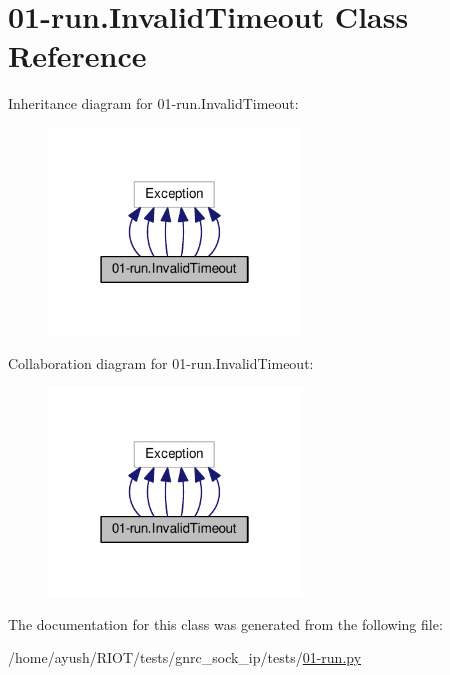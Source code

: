 \hypertarget{class01-run_1_1InvalidTimeout}{}\section{01-\/run.Invalid\+Timeout Class Reference}
\label{class01-run_1_1InvalidTimeout}


Inheritance diagram for 01-\/run.Invalid\+Timeout\+:
\nopagebreak
\begin{figure}[H]
\begin{center}
\leavevmode
\includegraphics[width=190pt]{class01-run_1_1InvalidTimeout__inherit__graph}
\end{center}
\end{figure}


Collaboration diagram for 01-\/run.Invalid\+Timeout\+:
\nopagebreak
\begin{figure}[H]
\begin{center}
\leavevmode
\includegraphics[width=190pt]{class01-run_1_1InvalidTimeout__coll__graph}
\end{center}
\end{figure}


The documentation for this class was generated from the following file\+:\begin{DoxyCompactItemize}
\item 
/home/ayush/\+R\+I\+O\+T/tests/gnrc\+\_\+sock\+\_\+ip/tests/\hyperlink{gnrc__sock__ip_2tests_201-run_8py}{01-\/run.\+py}\end{DoxyCompactItemize}
